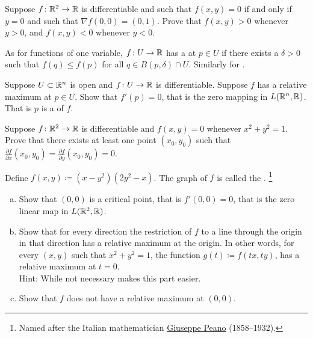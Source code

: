 \begin{exercise}
Suppose $f \colon {\mathbb{R}}^2 \to {\mathbb{R}}$ is differentiable and such that
$f(x,y) = 0$ if and only if $y=0$ and such that $\nabla f(0,0) = (0,1)$.
Prove that $f(x,y) > 0$ whenever $y > 0$, and
$f(x,y) < 0$ whenever $y < 0$.
\end{exercise}

\begin{exnote}
\pagebreak[2]
As for functions of one variable, $f \colon U \to {\mathbb{R}}$ has a
\emph{} at $p \in U$ if there exists
a $\delta >0$ such that $f(q) \leq f(p)$ for all $q \in B(p,\delta) \cap U$.
Similarly for \emph{}.
\end{exnote}

\begin{exercise} \label{exercise:mv:maximumcritical}
Suppose $U \subset {\mathbb{R}}^n$ is open and
$f \colon U \to {\mathbb{R}}$ is differentiable.  Suppose $f$ has a relative maximum
at $p \in U$.  Show that $f'(p) = 0$, that is the zero mapping in
$L({\mathbb{R}}^n,{\mathbb{R}})$.  That is $p$ is a
\emph{} of $f$.
\end{exercise}

\begin{exercise}
Suppose $f \colon {\mathbb{R}}^2 \to {\mathbb{R}}$ is differentiable and 
$f(x,y) = 0$ whenever $x^2+y^2 = 1$.
Prove that there exists at least
one point $(x_0,y_0)$ such that
$\frac{\partial f}{\partial x}(x_0,y_0) = \frac{\partial f}{\partial
y}(x_0,y_0) = 0$.
\end{exercise}

\begin{exercise} \label{exercise:peano}
Define $f(x,y) \coloneqq ( x-y^2 ) ( 2 y^2 - x)$.  The graph of $f$ is called
the \emph{}.%
\footnote{Named after the Italian mathematician
\href{https://en.wikipedia.org/wiki/Giuseppe_Peano}{Giuseppe Peano}
(1858--1932).}
\begin{enumerate}[a)]
\item
Show that
$(0,0)$ is a critical point, that is $f'(0,0) = 0$, that is the zero
linear map in $L({\mathbb{R}}^2,{\mathbb{R}})$.
\item
Show that for every direction the restriction of $f$ to a line through the origin
in that direction has a relative maximum at the origin.  In other words,
for every $(x,y)$ such that $x^2+y^2=1$, the function $g(t) \coloneqq f(tx,ty)$,
has a relative maximum at $t=0$.\\
Hint: While not necessary
makes
this part easier.
\item
Show that $f$ does not have a relative maximum at $(0,0)$.
\end{enumerate}
\end{exercise}

